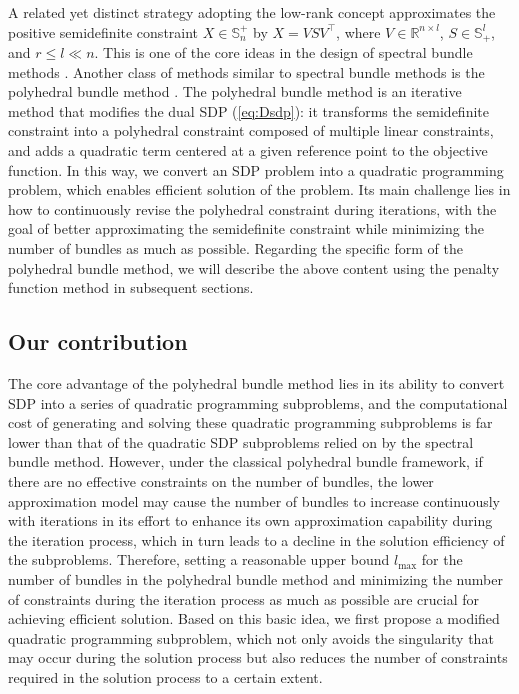 \documentclass{jcmlatex}
\begin{document}
A related yet distinct strategy adopting the low-rank concept approximates the positive semidefinite constraint \( X \in \mathbb{S}_n^+ \) by \( X = V S V^\top \), where \( V \in \mathbb{R}^{n \times l} \), \( S \in \mathbb{S}_+^l \), and \( r \leq l \ll n \). This is one of the core ideas in the design of spectral bundle methods \cite{helmberg2000spectral,ding2023revisiting}. Another class of methods similar to spectral bundle methods is the polyhedral bundle method \cite{krishnan2006unifying,Gu2017optimization}. The polyhedral bundle method is an iterative method that modifies the dual SDP (\ref{eq:Dsdp}): it transforms the semidefinite constraint into a polyhedral constraint composed of multiple linear constraints, and adds a quadratic term centered at a given reference point to the objective function. In this way, we convert an SDP problem into a quadratic programming problem, which enables efficient solution of the problem. Its main challenge lies in how to continuously revise the polyhedral constraint during iterations, with the goal of better approximating the semidefinite constraint while minimizing the number of bundles as much as possible. Regarding the specific form of the polyhedral bundle method, we will describe the above content using the penalty function method in subsequent sections.  
\subsection{Our contribution}
The core advantage of the polyhedral bundle method lies in its ability to convert SDP into a series of quadratic programming subproblems, and the computational cost of generating and solving these quadratic programming subproblems is far lower than that of the quadratic SDP subproblems relied on by the spectral bundle method. However, under the classical polyhedral bundle framework, if there are no effective constraints on the number of bundles, the lower approximation model may cause the number of bundles to increase continuously with iterations in its effort to enhance its own approximation capability during the iteration process, which in turn leads to a decline in the solution efficiency of the subproblems. Therefore, setting a reasonable upper bound \( l_{\max} \) for the number of bundles in the polyhedral bundle method and minimizing the number of constraints during the iteration process as much as possible are crucial for achieving efficient solution. Based on this basic idea, we first propose a modified quadratic programming subproblem, which not only avoids the singularity that may occur during the solution process but also reduces the number of constraints required in the solution process to a certain extent.
\end{document}
